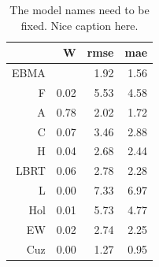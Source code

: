 \documentclass[12pt,fullpage,endnotes]{article}
\begin{document}
\begin{table}[ht]
\caption{The model names need to be fixed. Nice caption here.}
\label{presModel}
\begin{center}
\begin{tabular}{rrrr}
  \toprule
 & W & rmse & mae \\ 
  \midrule
EBMA &  & 1.92 & 1.56 \\ 
  F & 0.02 & 5.53 & 4.58 \\ 
  A & 0.78 & 2.02 & 1.72 \\ 
  C & 0.07 & 3.46 & 2.88 \\ 
  H & 0.04 & 2.68 & 2.44 \\ 
  LBRT & 0.06 & 2.78 & 2.28 \\ 
  L & 0.00 & 7.33 & 6.97 \\ 
  Hol & 0.01 & 5.73 & 4.77 \\ 
  EW & 0.02 & 2.74 & 2.25 \\ 
  Cuz & 0.00 & 1.27 & 0.95 \\ 
   \bottomrule
\end{tabular}
\end{center}
\end{table}


\end{document}
